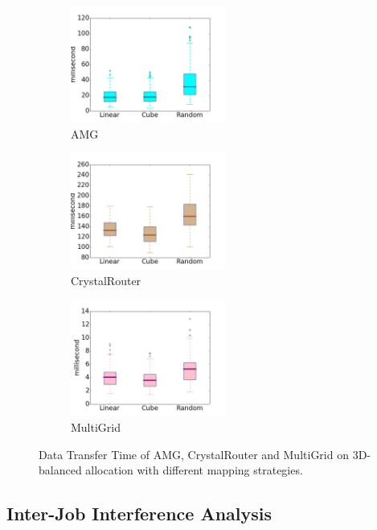 \documentclass[conference]{IEEEtran}
\begin{document}
\begin{figure}[t!]
    \centering
    \begin{subfigure}[t]{0.32\textwidth}
        \centering
        \includegraphics[height=1.5in]{figs/diffmapping/amg}
        \caption{AMG}
        \label{fig:diffmap-amg}
    \end{subfigure}%
    \hspace{1em}%
    \begin{subfigure}[t]{0.32\textwidth}
        \centering
        \includegraphics[height=1.5in]{figs/diffmapping/cr}
        \caption{CrystalRouter}
        \label{fig:diffmap-cr}
    \end{subfigure}%
    \begin{subfigure}[t]{0.32\textwidth}
        \centering
        \includegraphics[height=1.5in]{figs/diffmapping/mg}
        \caption{MultiGrid}
        \label{fig:diffmap-mg}
    \end{subfigure}%
   \caption{Data Transfer Time of AMG, CrystalRouter and MultiGrid on 3D-balanced allocation with different mapping strategies.}
   \label{fig:diffmap}
\end{figure}




\subsection{Inter-Job Interference Analysis}
\label{sec: interjob interference study}
\end{document}
